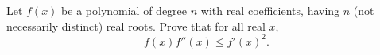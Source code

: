 Let $f(x)$ be a polynomial of degree $n$ with real coefficients, having $n$ (not necessarily distinct) real roots. Prove that for all real $x$,
$$f(x)f''(x)\le f'(x)^2.$$